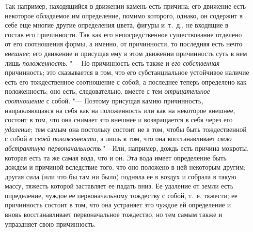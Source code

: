 Так например, находящийся в движении камень есть причина; его движение есть
некоторое обладаемое им определение, помимо которого, однако, он содержит в
себе еще многие другие определения цвета, фигуры и~т.~д., не входящие в
состав его причинности. Так как его непосредственное существование отделено
от его соотношения формы, а именно, от причинности, то последняя есть нечто
{\em внешнее}; его движение и присущая ему в этом
движении причинность суть в нем лишь
{\em положенность}. "--- Но причинность есть также и
{\em его собственная} причинность; это сказывается в
том, что его субстанциальное устойчивое наличие есть его тождественное
соотношение с собой, а последнее теперь определено как положенность; оно
есть, следовательно, вместе с тем {\em отрицательное
соотношение} с собой. "--- Поэтому присущая камню причинность, направляющаяся
на себя как на положенность или как на некоторое внешнее, состоит в том,
что она снимает это внешнее и возвращается в себя через его
{\em удаление}; тем самым она постольку состоит не в
том, чтобы быть тождественной с собой {\em в своей
положенности}, а лишь в том, что она восстанавливает
{\em свою абстрактную первоначальность}."---Или, например,
дождь есть причина мокроты, которая есть та же самая вода, что и он. Эта
вода имеет определение быть дождем и причиной вследствие того, что оно
положено в ней некоторым другим; другая сила (или что бы там ни было)
подняла ее в воздух и собрала в такую массу, тяжесть которой заставляет ее
падать вниз. Ее удаление от земли есть определение, чуждое ее
первоначальному тождеству с собой, т.~е. тяжести; ее причинность состоит в
том, что она устраняет это чуждое ей определение и вновь восстанавливает
первоначальное тождество, но тем самым также и упраздняет свою причинность.

